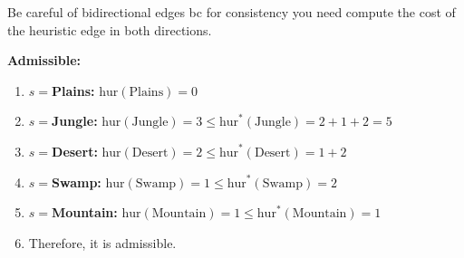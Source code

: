 \begin{warning}
    Be careful of bidirectional edges bc for consistency you need compute the cost of the heuristic edge in both directions.
\end{warning}

\begin{example}

    \textbf{Admissible:}
    \begin{enumerate}
        \item \textbf{$s=$Plains:} $\text{hur}(\text{Plains}) = 0$ 
        \item \textbf{$s=$Jungle:} $\text{hur}(\text{Jungle}) = 3 \leq \text{hur}^*(\text{Jungle}) = 2 + 1 + 2 = 5$
        \item \textbf{$s=$Desert:} $\text{hur}(\text{Desert}) = 2 \leq \text{hur}^*(\text{Desert}) = 1 + 2$
        \item \textbf{$s=$Swamp:} $\text{hur}(\text{Swamp}) = 1 \leq \text{hur}^*(\text{Swamp}) = 2$
        \item \textbf{$s=$Mountain:} $\text{hur}(\text{Mountain}) = 1 \leq \text{hur}^*(\text{Mountain}) = 1$
        \item Therefore, it is admissible.
    \end{enumerate}
    \vspace{1em}


\end{example}
